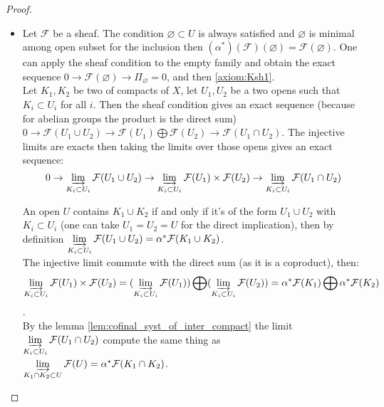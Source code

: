 \begin{proof}
    \begin{itemize}
        \item Let $\mathcal{F}$ be a sheaf. The condition $\varnothing \subset U$ is always satisfied and $\varnothing$ is minimal among open subset for the inclusion then $(\alpha^*)(\mathcal{F})(\varnothing)=\mathcal{F}(\varnothing)$. One can apply the sheaf condition to the empty family and obtain the exact sequence $0\to \mathcal{F}(\varnothing)\to \Pi_{\varnothing}=0$, and then \eqref{axiom:Ksh1}.\\

        Let $K_1,K_2$ be two of compacts of $X$, let $U_1,U_2$ be a two opens such that $K_i\subset U_i$ for all $i$. Then the sheaf condition gives an exact sequence (because for abelian groups the product is the direct sum) $0\to \mathcal{F}(U_1\cup U_2)\to \mathcal{F}(U_1)\bigoplus\mathcal{F}(U_2)\to \mathcal{F}(U_1\cap U_2)$. The injective limits are exacts then taking the limits over those opens gives an exact sequence: 
        \begin{equation}\label{lim_of_sheaf_cond}
            0\to \varinjlim\limits_{K_i\subset U_i}\mathcal{F}(U_1\cup U_2)\to \varinjlim\limits_{K_i\subset U_i}\mathcal{F}(U_1)\times\mathcal{F}(U_2)\to \varinjlim\limits_{K_i\subset U_i}\mathcal{F}(U_1\cap U_2)
        \end{equation}

        An open $U$ contains $K_1\cup K_2$ if and only if it's of the form $U_1\cup U_2$ with $K_i\subset U_i$ (one can take $U_1=U_2=U$ for the direct implication), then by definition $\varinjlim\limits_{K_i\subset U_i}\mathcal{F}(U_1\cup U_2)=\alpha^*\mathcal{F}(K_1\cup K_2)$.\\
        
        The injective limit commute with the direct sum (as it is a coproduct), then: \[\varinjlim\limits_{K_i\subset U_i}\mathcal{F}(U_1)\times\mathcal{F}(U_2)=(\varinjlim\limits_{K_i\subset U_i}\mathcal{F}(U_1))\bigoplus(\varinjlim\limits_{K_i\subset U_i}\mathcal{F}(U_2))=\alpha^*\mathcal{F}(K_1)\bigoplus\alpha^*\mathcal{F}(K_2)\].\\
        
        By the lemma \ref{lem:cofinal_syst_of_inter_compact} the limit $\varinjlim\limits_{K_i\subset U_i}\mathcal{F}(U_1\cap U_2)$ compute the same thing as $\varinjlim\limits_{K_1\cap K_2\subset U}\mathcal{F}(U)=\alpha^*\mathcal{F}(K_1\cap K_2)$.\\


\end{itemize}
\end{proof}
